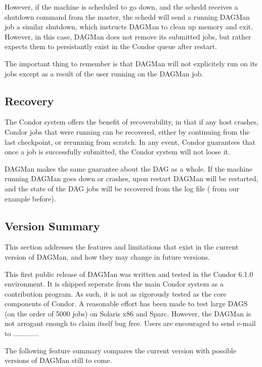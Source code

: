 However, if the machine is scheduled to go down, and the schedd receives a
shutdown command from the master, the schedd will send a running DAGMan job a
similar shutdown, which instructs DAGMan to clean up memory and exit.
However, in this case, DAGMan does not remove its submitted jobs, but rather
expects them to persistantly exist in the Condor queue after restart.

The important thing to remember is that DAGMan will not explicitely run
 on its jobs except as a result of the user running  on
the DAGMan job.

\subsection{Recovery}

The Condor system offers the benefit of recoverability, in that if any host
crashes, Condor jobs that were running can be recovered, either by continuing
from the last checkpoint, or rerunning from scratch.  In any event, Condor
guarantees that once a job is successfully submitted, the Condor system will
not loose it.

DAGMan makes the same guarantee about the DAG as a whole.  If the machine
running DAGMan goes down or crashes, upon restart DAGMan will be restarted,
and the state of the DAG jobs will be recovered from the log file
( from our example before).

\subsection{Version Summary}
\label{dagman:version}

This section addresses the features and limitations that exist in the current
version of DAGMan, and how they may change in future versions.

This first public release of DAGMan was written and tested in the Condor 6.1.0
environment.  It is shipped seperate from the main Condor system as a
contribution program.  As such, it is not as rigorously tested as the core
components of Condor.  A reasonable effort has been made to test large DAGS
(on the order of 5000 jobs) on Solaris x86 and Sparc.  However, the DAGMan is
not arrogant enough to claim itself bug free.  Users are encouraged to send
e-mail to \texttt{}.............

The following feature summary compares the current version with possible
versions of DAGMan still to come.

